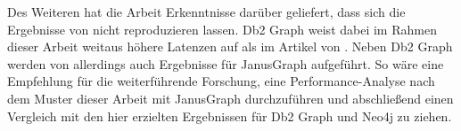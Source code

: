 Des Weiteren hat die Arbeit Erkenntnisse darüber geliefert, dass sich die Ergebnisse von  nicht reproduzieren lassen. Db2 Graph weist dabei im Rahmen dieser Arbeit weitaus höhere Latenzen auf als im Artikel von . Neben Db2 Graph werden von  allerdings auch Ergebnisse für JanusGraph aufgeführt. So wäre eine Empfehlung für die weiterführende Forschung, eine Performance-Analyse nach dem Muster dieser Arbeit mit JanusGraph durchzuführen und abschließend einen Vergleich mit den hier erzielten Ergebnissen für Db2 Graph und Neo4j zu ziehen.